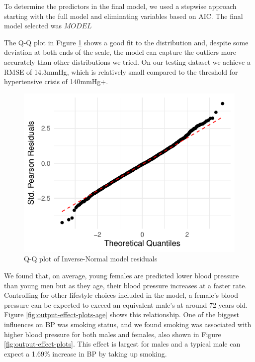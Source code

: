 \documentclass[
  11pt,
  twocolumn]{article}
\begin{document}
To determine the predictors in the final model, we used a stepwise
approach starting with the full model and eliminating variables based on
AIC. The final model selected was \(MODEL\)

The Q-Q plot in Figure \ref{fig:output-qq-plot} shows a good fit to the
distribution and, despite some deviation at both ends of the scale, the
model can capture the outliers more accurately than other distributions
we tried. On our testing dataset we achieve a RMSE of 14.3mmHg, which is
relatively small compared to the threshold for hypertensive crisis of
140mmHg+.

\begin{figure}[H]

{\centering \includegraphics{Coursework_files/figure-latex/output-qq-plot-1} 

}

\caption{Q-Q plot of Inverse-Normal model residuals}\label{fig:output-qq-plot}
\end{figure}

We found that, on average, young females are predicted lower blood
pressure than young men but as they age, their blood pressure increases
at a faster rate. Controlling for other lifestyle choices included in
the model, a female's blood pressure can be expected to exceed an
equivalent male's at around 72 years old. Figure
\ref{fig:output-effect-plots-age} shows this relationship. One of the
biggest influences on BP was smoking status, and we found smoking was
associated with higher blood pressure for both males and females, also
shown in Figure \ref{fig:output-effect-plots}. This effect is largest
for males and a typical male can expect a 1.69\% increase in BP by
taking up smoking.
\end{document}

